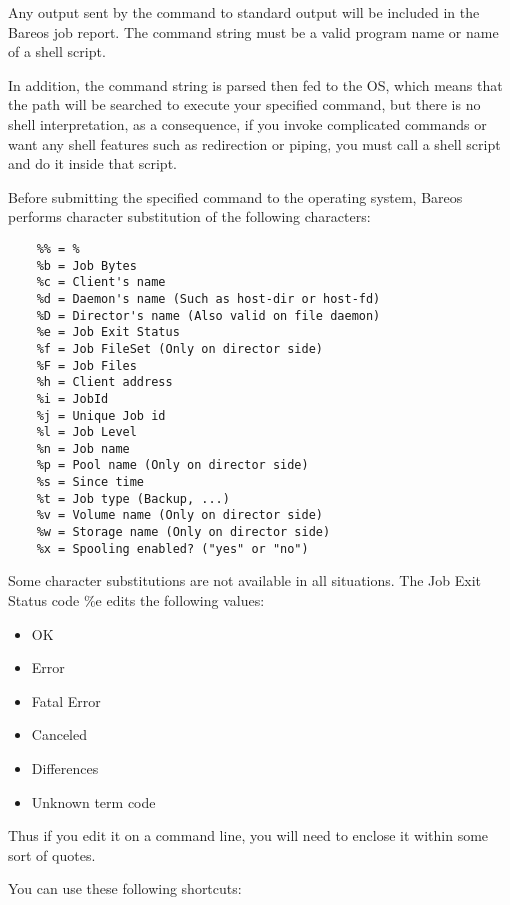 \begin{description}
Any output sent by the command to standard output will be included in the
Bareos job report.  The command string must be a valid program name or name
of a shell script.

In addition, the command string is parsed then fed to the OS,
which means that the path will be searched to execute your specified
command, but there is no shell interpretation, as a consequence, if you
invoke complicated commands or want any shell features such as redirection
or piping, you must call a shell script and do it inside that script.

Before submitting the specified command to the operating system, Bareos
performs character substitution of the following characters:

\label{character substitution}
\footnotesize
\begin{verbatim}
    %% = %
    %b = Job Bytes
    %c = Client's name
    %d = Daemon's name (Such as host-dir or host-fd)
    %D = Director's name (Also valid on file daemon)
    %e = Job Exit Status
    %f = Job FileSet (Only on director side)
    %F = Job Files
    %h = Client address
    %i = JobId
    %j = Unique Job id
    %l = Job Level
    %n = Job name
    %p = Pool name (Only on director side)
    %s = Since time
    %t = Job type (Backup, ...)
    %v = Volume name (Only on director side)
    %w = Storage name (Only on director side)
    %x = Spooling enabled? ("yes" or "no")
\end{verbatim}
\normalsize

Some character substitutions are not available in all situations. The Job Exit
Status code \%e edits the following values:

\begin{itemize}
\item OK
\item Error
\item Fatal Error
\item Canceled
\item Differences
\item Unknown term code
\end{itemize}

   Thus if you edit it on a command line, you will need to enclose
   it within some sort of quotes.


You can use these following shortcuts:\\


\end{description}
